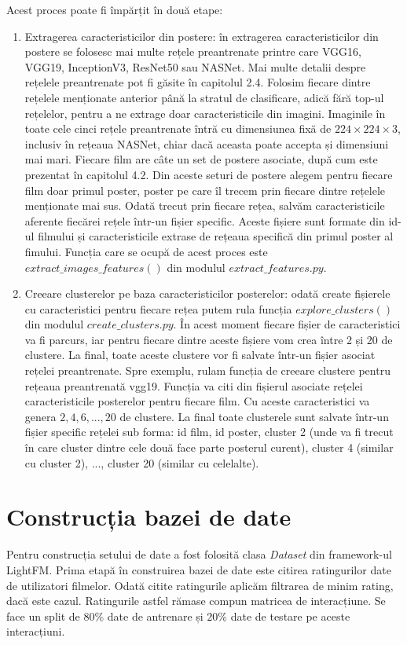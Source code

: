 Acest proces poate fi împărțit în două etape:
\begin{enumerate}
	\item Extragerea caracteristicilor din postere: în extragerea caracteristicilor din postere se folosesc mai multe rețele preantrenate printre care VGG16, VGG19, InceptionV3, ResNet50 sau NASNet. Mai multe detalii despre rețelele preantrenate pot fi găsite în capitolul 2.4. Folosim fiecare dintre rețelele menționate anterior până la stratul de clasificare, adică fără top-ul rețelelor, pentru a ne extrage doar caracteristicile din imagini. Imaginile în toate cele cinci rețele preantrenate întră cu dimensiunea fixă de $224 \times 224 \times 3$, inclusiv în rețeaua NASNet, chiar dacă aceasta poate accepta și dimensiuni mai mari. Fiecare film are câte un set de postere asociate, după cum este prezentat în capitolul 4.2. Din aceste seturi de postere alegem pentru fiecare film doar primul poster, poster pe care îl trecem prin fiecare dintre rețelele menționate mai sus. Odată trecut prin fiecare rețea, salvăm caracteristicile aferente fiecărei rețele într-un fișier specific. Aceste fișiere sunt formate din id-ul filmului și caracteristicile extrase de rețeaua specifică din primul poster al fimului.
Funcția care se ocupă de acest proces este $extract\_images\_features()$ din modulul $extract\_features.py$.
	\item Creeare clusterelor pe baza caracteristicilor posterelor: odată create fișierele cu caracteristici pentru fiecare rețea putem rula funcția $explore\_clusters()$ din modulul $create\_clusters.py$. În acest moment fiecare fișier de caracteristici va fi parcurs, iar pentru fiecare dintre aceste fișiere vom crea între 2 și 20 de clustere. La final, toate aceste clustere vor fi salvate într-un fișier asociat rețelei preantrenate. Spre exemplu, rulam funcția de creeare clustere pentru rețeaua preantrenată vgg19. Funcția va citi din fișierul asociate rețelei caracteristicile posterelor pentru fiecare film. Cu aceste caracteristici va genera $2, 4, 6, ..., 20$ de clustere. La final toate clusterele sunt salvate într-un fișier specific rețelei sub forma: id film, id poster, cluster 2 (unde va fi trecut în care cluster dintre cele două face parte posterul curent), cluster 4 (similar cu cluster 2), ..., cluster 20 (similar cu celelalte).
\end{enumerate}

\section{Construcția bazei de date}
Pentru construcția setului de date a fost folosită clasa \textit{Dataset} din framework-ul LightFM. Prima etapă în construirea bazei de date este citirea ratingurilor date de utilizatori filmelor. Odată citite ratingurile aplicăm filtrarea de minim rating, dacă este cazul. Ratingurile astfel rămase compun matricea de interacțiune. Se face un split de $80\%$ date de antrenare și $20\%$ date de testare pe aceste interacțiuni.

